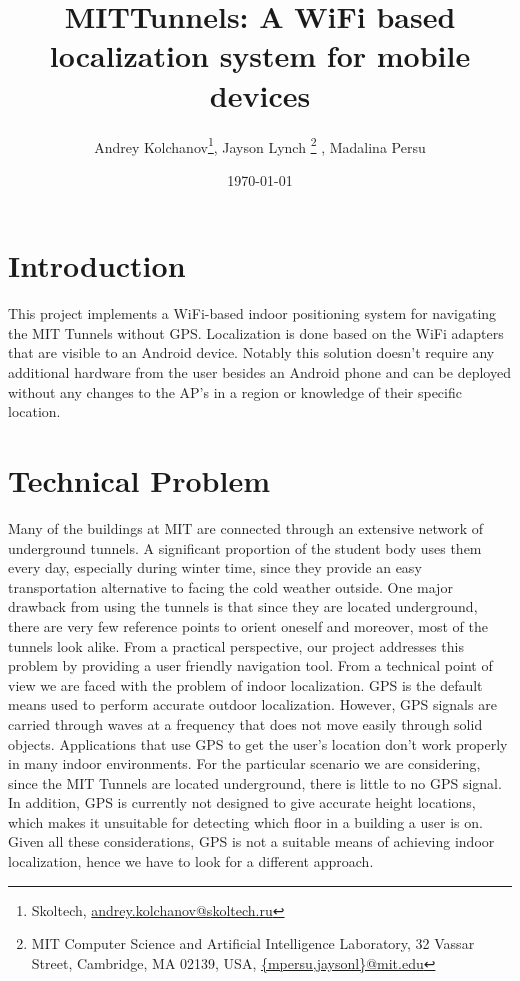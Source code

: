 \documentclass[11pt]{article}
\begin{document}
\title{MITTunnels: A WiFi based localization system for mobile devices}
\author{Andrey Kolchanov\thanks{Skoltech, \protect\url{andrey.kolchanov@skoltech.ru}}, Jayson Lynch \thanks{MIT Computer Science and Artificial Intelligence Laboratory,
32 Vassar Street, Cambridge, MA 02139, USA,
\protect\url{{mpersu,jaysonl}@mit.edu}}
, Madalina Persu\footnotemark[2]}
\date{\today}
\maketitle
%
%
\section{Introduction}
This project implements a WiFi-based indoor positioning system for navigating the MIT Tunnels without GPS. Localization is done based on the WiFi adapters that are visible to an Android device. Notably this solution doesn’t require any additional hardware from the user besides an Android phone and can be deployed without any changes to the AP’s in a region or knowledge of their specific location.

\section{Technical Problem}
Many of the buildings at MIT are connected through an extensive network of underground tunnels. A significant proportion of the student body uses them every day, especially during winter time, since they provide an easy transportation alternative to facing the cold weather outside. One major drawback from using the tunnels is that since they are located underground, there are very few reference points to orient oneself and moreover, most of the tunnels look alike. From a practical perspective, our project addresses this problem by providing a user friendly navigation tool.
From a technical point of view we are faced with the problem of indoor localization. GPS is the default means used to perform accurate outdoor localization. However, GPS signals are carried through waves at a frequency that does not move easily through solid objects. Applications that use GPS to get the user’s location don't work properly in many indoor environments. For the particular scenario we are considering, since the MIT Tunnels are located underground, there is little to no GPS signal. In addition, GPS is currently not designed to give accurate height locations, which makes it unsuitable for detecting which floor in a building a user is on. Given all these considerations, GPS is not a suitable means of achieving indoor localization, hence we have to look for a different approach.
\end{document}
